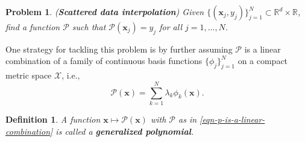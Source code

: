 \documentclass[12pt]{report} %
\newtheorem{definition}{Definition}
\newtheorem{problem}{Problem}
\newcommand{\tmmathbf}[1]{\ensuremath{\boldsymbol{#1}}}
\newcommand{\tmstrong}[1]{\textbf{#1}}
\begin{document}
\begin{problem}
  ({\tmstrong{Scattered data interpolation}}) Given $\{ (\tmmathbf{x}_j, y_j)
  \}_{j = 1}^N \subset \mathbb{R}^d \times \mathbb{R}$, find a function
  $\mathcal{P}$ such that $\mathcal{P} (\tmmathbf{x}_j) = y_j$ for all $j = 1,
  \ldots, N$.\label{interpolationproblemstatement}
\end{problem}

One strategy for tackling this problem is by further assuming $\mathcal{P}$ is
a linear combination of a family of continuous basis functions $\{ \phi_j
\}_{j = 1}^N$ on a compact metric space $\mathcal{X}$, i.e.,
\begin{equation}
  \mathcal{P} (\tmmathbf{x}) = \sum_{k = 1}^N \lambda_k \phi_k (\tmmathbf{x})
  . \label{eqn-p-is-a-linear-combination}
\end{equation}
\begin{definition}
  A function $\tmmathbf{x} \mapsto \mathcal{P} (\tmmathbf{x})$ with
  $\mathcal{P}$ as in \eqref{eqn-p-is-a-linear-combination} is called a
  {\tmstrong{generalized polynomial}}.
\end{definition}
\end{document}

